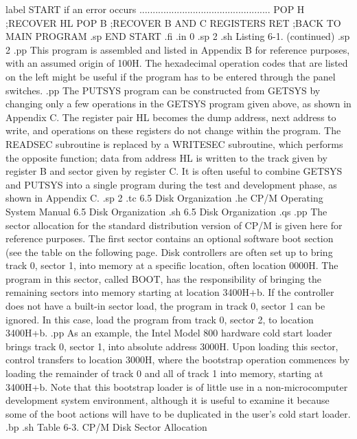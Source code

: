           label START if an error occurs
          .................................................
          POP H           ;RECOVER HL
          POP B           ;RECOVER B AND C REGISTERS
          RET             ;BACK TO MAIN PROGRAM
.sp
          END START
.fi
.in 0
.sp 2
.sh
                    Listing 6-1.  (continued)
.sp 2
.pp
This program is assembled and listed in Appendix B for reference 
purposes, with an assumed origin of 100H.  The hexadecimal 
operation codes that are listed on the left might be useful if the 
program has to be entered through the panel switches.
.pp
The PUTSYS program can be constructed from GETSYS by changing 
only a few operations in the GETSYS program given above, as shown 
in Appendix C.  The register pair HL becomes the dump address, 
next address to write, and operations on these registers do not 
change within the program.  The READSEC subroutine is replaced by 
a WRITESEC subroutine, which performs the opposite function; data
from address HL is written to the track given by register B 
and sector given by register C.  It is often useful to combine 
GETSYS and PUTSYS into a single program during the test and 
development phase, as shown in Appendix C.
.sp 2
.tc    6.5  Disk Organization
.he CP/M Operating System Manual               6.5  Disk Organization
.sh
6.5  Disk Organization
.qs
.pp
The sector allocation for the standard distribution version of 
CP/M is given here for reference purposes.  The first sector contains
an optional software boot section (see the table on the following 
page.   Disk controllers are often set up to bring track 0, 
sector 1, into memory at a specific location, often location 
0000H.  The program in this sector, called BOOT, has the 
responsibility of bringing the remaining sectors into memory 
starting at location 3400H+b.  If the controller does not 
have a built-in sector load, the program in track 0, sector 1 can 
be ignored.  In this case, load the program from track 0, sector 
2, to location 3400H+b.
.pp
As an example, the Intel Model 800 
hardware cold start loader brings track 0, sector 1, into 
absolute address 3000H.  Upon loading this sector, control 
transfers to location 3000H, where the bootstrap operation 
commences by loading the remainder of track 0 and all of track 1 
into memory, starting at 3400H+b.  Note that this bootstrap 
loader is of little use in a non-microcomputer development system 
environment, although it is useful to examine it because some of 
the boot actions will have to be duplicated in the user's cold 
start loader.
.bp
.sh
             Table 6-3.  CP/M Disk Sector Allocation
